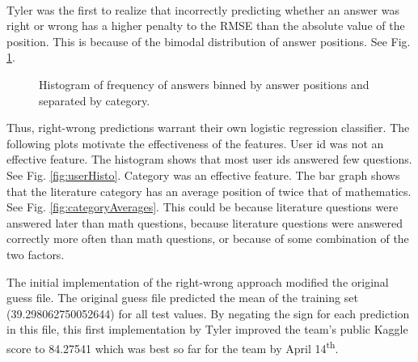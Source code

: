 \documentclass[letterpaper]{article}
\begin{document}
\paragraph{} Tyler was the first to realize that incorrectly predicting whether an answer was right or wrong has a higher penalty to the RMSE than the absolute value of the position. This is because of the bimodal distribution of answer positions. See Fig. \ref{fig:categoryPositions}.


\begin{figure}[H]
	\begin{center}
	\end{center}
	\caption{Histogram of frequency of answers binned by answer positions and separated by category.}
	\label{fig:categoryPositions}
\end{figure}

Thus, right-wrong predictions warrant their own logistic regression classifier. The following plots motivate the effectiveness of the features. User id was not an effective feature. The histogram shows that most user ids answered few questions. See Fig. \ref{fig:userHisto}. Category was an effective feature. The bar graph shows that the literature category has an average position of twice that of mathematics. See Fig. \ref{fig:categoryAverages}. This could be because literature questions were answered later than math questions, because literature questions were answered correctly more often than math questions, or because of some combination of the two factors. 

The initial implementation of the right-wrong approach modified the original guess file. The original guess file predicted the mean of the training set (39.298062750052644) for all test values. By negating the sign for each prediction in this file, this first implementation by Tyler improved the team's public Kaggle score to 84.27541 which was best so far for the team by April 14\textsuperscript{th}.
\end{document}
